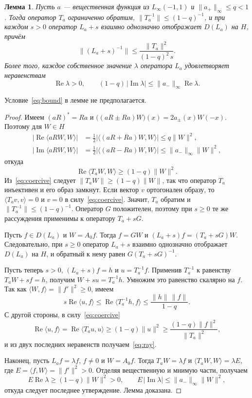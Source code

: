 \documentclass[12pt,a4paper]{article}
\newtheorem{lemma}{Лемма}
\theoremstyle{definition}
\newcommand{\norm}[1]{\lVert#1\rVert}
\newcommand{\abs}[1]{\lvert#1\rvert}
\newcommand{\inner}[2]{\langle#1,#2\rangle}
\begin{document}
\begin{lemma}\label{lem:coercive}
Пусть $a$ --- вещественная функция из $L_\infty(-1,1)$ и $\norm{a_+}_\infty\le q<1$.
Тогда оператор $T_a$ ограниченно обратим, $\norm{T_a^{-1}}\le(1-q)^{-1}$, и при каждом
$s>0$ оператор $L_a+s$ взаимно однозначно отображает $D(L_a)$ на $H$, причём
\begin{equation}\label{eq:ray}
 \norm{(L_a+s)^{-1}}\le\frac{\norm{T_a}^2}{(1-q)^2\,s}.
\end{equation}
Более того, каждое собственное значение $\lambda$ оператора $L_a$ удовлетворяет
неравенствам
\[
 \operatorname{Re}\lambda>0,\qquad
 (1-q)\,\abs{\operatorname{Im}\lambda}\le\norm{a_-}_\infty\operatorname{Re}\lambda .
\]
\end{lemma}
Условие~\eqref{eq:bound} в лемме не предполагается.
\begin{proof}
Имеем $(aR)^*=Ra$ и $\bigl((aR\pm Ra)W\bigr)(x)=2a_\pm(x)W(-x)$. Поэтому для $W\in H$
\begin{align*}
 \abs{\operatorname{Re}\inner{aRW}{W}}&=\tfrac12\abs{\inner{(aR+Ra)W}{W}}\le q\norm W^2,\\
 \abs{\operatorname{Im}\inner{aRW}{W}}&=\tfrac12\abs{\inner{(aR-Ra)W}{W}}
 \le\norm{a_-}_\infty\norm W^2 ,
\end{align*}
откуда
\begin{equation}\label{eq:coercive}
 \operatorname{Re}\inner{T_aW}{W}\ge(1-q)\norm W^2 .
\end{equation}
Из~\eqref{eq:coercive} следует $\norm{T_aW}\ge(1-q)\norm W$, так что оператор $T_a$
инъективен и его образ замкнут. Если вектор $v$ ортогонален образу, то
$\inner{T_av}{v}=0$ и $v=0$ в силу~\eqref{eq:coercive}. Значит, $T_a$ обратим и
$\norm{T_a^{-1}}\le(1-q)^{-1}$. Оператор $G$ положителен, поэтому при $s\ge0$ те же
рассуждения применимы к оператору $T_a+sG$.

Пусть $f\in D(L_a)$ и $W=A_0f$. Тогда $f=GW$ и $(L_a+s)f=(T_a+sG)W$. Следовательно, при
$s\ge0$ оператор $L_a+s$ взаимно однозначно отображает $D(L_a)$ на $H$, и обратный к нему
равен $G(T_a+sG)^{-1}$.

Пусть теперь $s>0$, $(L_a+s)f=h$ и $u=T_a^{-1}f$. Применив $T_a^{-1}$ к равенству
$T_aW+sf=h$, получим $W+su=T_a^{-1}h$. Умножим это равенство скалярно на $f$. Так как
$\inner Wf=\norm{f'}^2\ge0$, имеем
\[
 s\operatorname{Re}\inner uf\le\operatorname{Re}\inner{T_a^{-1}h}{f}
 \le\frac{\norm h\,\norm f}{1-q}.
\]
С другой стороны, в силу~\eqref{eq:coercive}
\[
 \operatorname{Re}\inner uf=\operatorname{Re}\inner{T_au}{u}\ge(1-q)\norm u^2
 \ge\frac{(1-q)\norm f^2}{\norm{T_a}^2},
\]
и из двух последних неравенств получаем~\eqref{eq:ray}.

Наконец, пусть $L_af=\lambda f$, $f\ne0$ и $W=A_0f$. Тогда $T_aW=\lambda f$ и
$\inner{T_aW}{W}=\lambda E$, где $E=\inner fW=\norm{f'}^2>0$. Отделяя вещественную и
мнимую части, получаем
\[
 E\operatorname{Re}\lambda\ge(1-q)\norm W^2>0,\qquad
 E\,\abs{\operatorname{Im}\lambda}\le\norm{a_-}_\infty\norm W^2 ,
\]
откуда следует последнее утверждение. Лемма доказана.
\end{proof}
\end{document}
